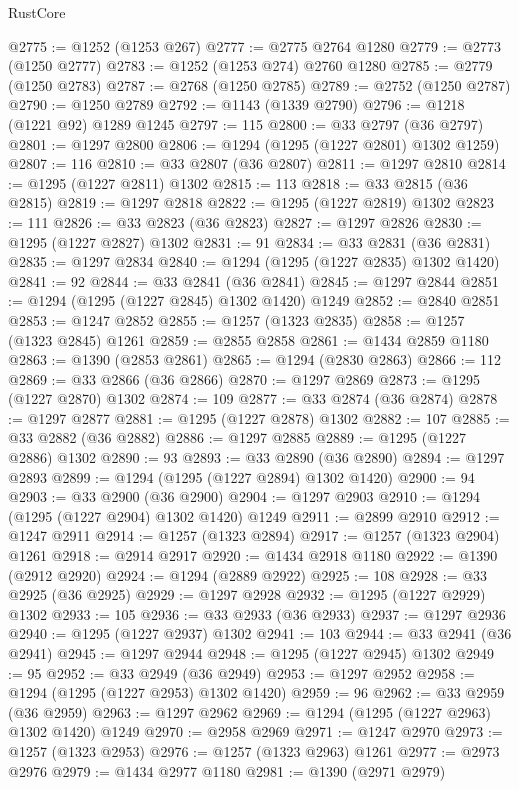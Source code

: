 \begin{lexlean}{RustCore}
\begin{coremodule}
@2775 := @1252 (@1253 @267)
@2777 := @2775 @2764 @1280
@2779 := @2773 (@1250 @2777)
@2783 := @1252 (@1253 @274) @2760 @1280
@2785 := @2779 (@1250 @2783)
@2787 := @2768 (@1250 @2785)
@2789 := @2752 (@1250 @2787)
@2790 := @1250 @2789
@2792 := @1143 (@1339 @2790)
@2796 := @1218 (@1221 @92) @1289 @1245
@2797 := 115
@2800 := @33 @2797 (@36 @2797)
@2801 := @1297 @2800
@2806 := @1294 (@1295 (@1227 @2801) @1302 @1259)
@2807 := 116
@2810 := @33 @2807 (@36 @2807)
@2811 := @1297 @2810
@2814 := @1295 (@1227 @2811) @1302
@2815 := 113
@2818 := @33 @2815 (@36 @2815)
@2819 := @1297 @2818
@2822 := @1295 (@1227 @2819) @1302
@2823 := 111
@2826 := @33 @2823 (@36 @2823)
@2827 := @1297 @2826
@2830 := @1295 (@1227 @2827) @1302
@2831 := 91
@2834 := @33 @2831 (@36 @2831)
@2835 := @1297 @2834
@2840 := @1294 (@1295 (@1227 @2835) @1302 @1420)
@2841 := 92
@2844 := @33 @2841 (@36 @2841)
@2845 := @1297 @2844
@2851 := @1294 (@1295 (@1227 @2845) @1302 @1420) @1249
@2852 := @2840 @2851
@2853 := @1247 @2852
@2855 := @1257 (@1323 @2835)
@2858 := @1257 (@1323 @2845) @1261
@2859 := @2855 @2858
@2861 := @1434 @2859 @1180
@2863 := @1390 (@2853 @2861)
@2865 := @1294 (@2830 @2863)
@2866 := 112
@2869 := @33 @2866 (@36 @2866)
@2870 := @1297 @2869
@2873 := @1295 (@1227 @2870) @1302
@2874 := 109
@2877 := @33 @2874 (@36 @2874)
@2878 := @1297 @2877
@2881 := @1295 (@1227 @2878) @1302
@2882 := 107
@2885 := @33 @2882 (@36 @2882)
@2886 := @1297 @2885
@2889 := @1295 (@1227 @2886) @1302
@2890 := 93
@2893 := @33 @2890 (@36 @2890)
@2894 := @1297 @2893
@2899 := @1294 (@1295 (@1227 @2894) @1302 @1420)
@2900 := 94
@2903 := @33 @2900 (@36 @2900)
@2904 := @1297 @2903
@2910 := @1294 (@1295 (@1227 @2904) @1302 @1420) @1249
@2911 := @2899 @2910
@2912 := @1247 @2911
@2914 := @1257 (@1323 @2894)
@2917 := @1257 (@1323 @2904) @1261
@2918 := @2914 @2917
@2920 := @1434 @2918 @1180
@2922 := @1390 (@2912 @2920)
@2924 := @1294 (@2889 @2922)
@2925 := 108
@2928 := @33 @2925 (@36 @2925)
@2929 := @1297 @2928
@2932 := @1295 (@1227 @2929) @1302
@2933 := 105
@2936 := @33 @2933 (@36 @2933)
@2937 := @1297 @2936
@2940 := @1295 (@1227 @2937) @1302
@2941 := 103
@2944 := @33 @2941 (@36 @2941)
@2945 := @1297 @2944
@2948 := @1295 (@1227 @2945) @1302
@2949 := 95
@2952 := @33 @2949 (@36 @2949)
@2953 := @1297 @2952
@2958 := @1294 (@1295 (@1227 @2953) @1302 @1420)
@2959 := 96
@2962 := @33 @2959 (@36 @2959)
@2963 := @1297 @2962
@2969 := @1294 (@1295 (@1227 @2963) @1302 @1420) @1249
@2970 := @2958 @2969
@2971 := @1247 @2970
@2973 := @1257 (@1323 @2953)
@2976 := @1257 (@1323 @2963) @1261
@2977 := @2973 @2976
@2979 := @1434 @2977 @1180
@2981 := @1390 (@2971 @2979)

\end{coremodule}
\end{lexlean}
